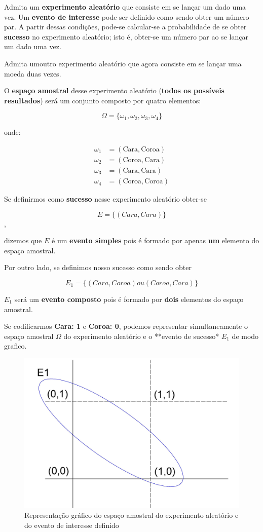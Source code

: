 \documentclass[
]{book}
\begin{document}
Admita um \textbf{experimento aleatório} que consiste em se lançar um dado uma vez. Um \textbf{evento de interesse} pode ser definido como sendo obter um número par. A partir dessas condições, pode-se calcular-se a probabilidade de se obter \textbf{sucesso} no experimento aleatório; isto é, obter-se um número par ao se lançar um dado uma vez.

Admita umoutro experimento aleatório que agora consiste em se lançar uma moeda duas vezes.

O \textbf{espaço amostral} desse experimento aleatório (\textbf{todos os possíveis resultados}) será um conjunto composto por quatro elementos:

\[
\Omega = \{\omega_{1}, \omega_{2}, \omega_{3}, \omega_{4}\}
\]

onde:

\begin{align*}
\omega_{1} & = (\text{Cara}, \text{Coroa})\\
\omega_{2} & = (\text{Coroa}, \text{Cara})\\
\omega_{3} & = (\text{Cara}, \text{Cara}) \\
\omega_{4} & = (\text{Coroa}, \text{Coroa})
\end{align*}

Se definirmos como \textbf{sucesso} nesse experimento aleatório obter-se

\[
E=\{(Cara, Cara)\}
\],

dizemos que \(E\) é um \textbf{evento simples} pois é formado por apenas \textbf{um} elemento do espaço amostral.

Por outro lado, se definimos nosso sucesso como sendo obter

\[
E_{1}=\{(Cara, Coroa) ou (Coroa, Cara)\}
\]

\(E_{1}\) será um \textbf{evento composto} pois é formado por \textbf{dois} elementos do espaço amostral.

Se codificarmos \textbf{Cara: 1} e \textbf{Coroa: 0}, podemos representar simultaneamente o espaço amostral \(\Omega\) do experimento aleatório e o **evento de sucesso* \(E_{1}\) de modo grafico.

\hfill\break

\begin{figure}

{\centering \includegraphics[width=0.5\linewidth]{images4/evento_grafico} 

}

\caption{Representação gráfico do espaço amostral do experimento aleatório e do evento de interesse definido}\label{fig:unnamed-chunk-54}
\end{figure}
\end{document}
